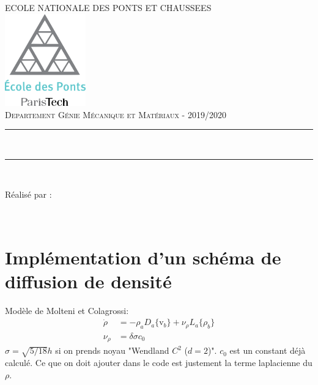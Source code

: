 \documentclass{article}
\begin{document}
\lstset{language=matlab}   

\begin{titlepage}
	\thispagestyle{empty}
	\newcommand{\HRule}{\rule{\linewidth}{0.5mm}}
	\center
	\textsc{\large ECOLE NATIONALE DES PONTS ET CHAUSSEES}\\[.7cm]
	\includegraphics[width=35mm]{img/ENPC_logo.png}\\[.5cm]
	\textsc{\large Departement Génie Mécanique et Matériaux - 2019/2020}\\[0.5cm]
	
	\vspace{2cm}
	
	\HRule \\[0.4cm]
	{\LARGE {\selectfont {SPH : Projet}}
    \vspace{0.4cm}
	\HRule \\[.5cm]

\vspace{3cm}

\large Réalisé par : 

\vspace{0.5cm}

{}
\\
\vspace{1cm}


}
\end{titlepage}


\newpage
\section{Implémentation d'un schéma de diffusion de densité}
Modèle de Molteni et Colagrossi: 
\begin{align*}
	\dot{\rho} &= -\rho_{a}D_{a}\{\text{v}_{b}\}+\nu_{\rho}L_{a}\{\rho_{b}\}\\
	\nu_{\rho} &= \delta\sigma c_{0} 
\end{align*}
$\sigma=\sqrt{5/18}h$ si on prends noyau "Wendland $C^2$ ($d=2$)". $c_0$ est un constant déjà calculé. Ce que on doit ajouter dans le code est justement la terme laplacienne du $\rho$.
\end{document}
